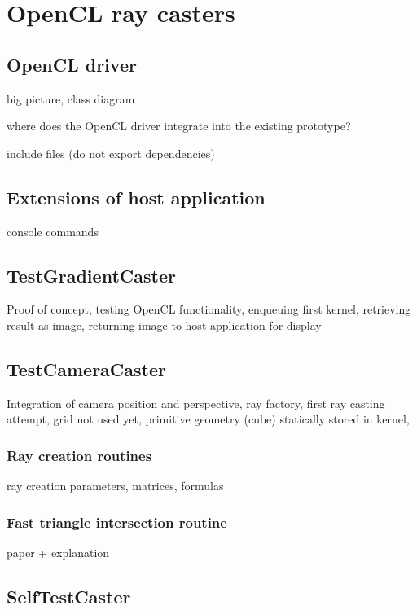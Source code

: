 \section{OpenCL ray casters}



\subsection{OpenCL driver}

big picture, class diagram

where does the OpenCL driver integrate into the existing prototype?

include files (do not export dependencies)

\subsection{Extensions of host application}

console commands

\subsection{TestGradientCaster}

Proof of concept, testing OpenCL functionality, enqueuing first kernel, retrieving result as image, returning image to host application for display

\subsection{TestCameraCaster}

Integration of camera position and perspective, ray factory, first ray casting attempt, grid not used yet, primitive geometry (cube) statically stored in kernel,

\subsubsection{Ray creation routines}

ray creation parameters, matrices, formulas

\subsubsection{Fast triangle intersection routine}

paper + explanation

\subsection{SelfTestCaster}

